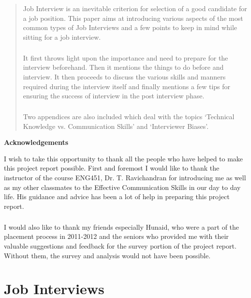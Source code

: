 \documentclass[a4paper,12pt]{report}
\makeatletter
\newcommand\ackname{Acknowledgements}
\newenvironment{acknowledgements}{%
      \titlepage
      \null\vfil
      \@beginparpenalty\@lowpenalty
      \begin{center}%
        \bfseries \ackname
        \@endparpenalty\@M
      \end{center}}%
     {\par\vfil\null\endtitlepage}
\newenvironment{acknowledgements}{%
      \if@twocolumn
        \section*{\abstractname}%
      \else
        \small
        \begin{center}%
          {\bfseries \ackname\vspace{-.5em}\vspace{\z@}}%
        \end{center}%
        \quotation
      \fi}
      {\if@twocolumn\else\endquotation\fi}
\makeatother
\begin{document}


\begin{abstract}
Job Interview is an inevitable criterion for selection of a good candidate for a job position. This paper aims at introducing various aspects
of the most common types of Job Interviews and a few points to keep in mind while sitting for a job interview.
\paragraph{}
It first throws light upon the importance and need to prepare for the interview beforehand. Then it mentions the
things to do before and interview. It then proceeds to discuss the various skills and manners required during the interview itself 
and finally mentions a few tips for ensuring the success of interview in the post interview phase.
\paragraph{}
Two appendices are also included which deal with the topics `Technical Knowledge vs. Communication Skills'
and `Interviewer Biases'.
\end{abstract}

\begin{acknowledgements}
I wish to take this opportunity to thank all the people who have helped to make this project report possible.
 First and foremost I would like to thank the instructor of the course ENG451, Dr. T. Ravichandran
for introducing me as well as my other classmates to the Effective Communication Skills
 in our day to day life. His guidance and advice has been a lot of help in preparing this project report.
\paragraph{}
I would also like to thank my friends especially Hunaid, who were a part of the placement process in
2011-2012 and the seniors who provided me with their valuable suggestions and feedback for
the survey portion of the project report. Without them, the survey and analysis would not have been possible.
\end{acknowledgements}

\tableofcontents
{}

\chapter{Job Interviews}             %
\end{document}
